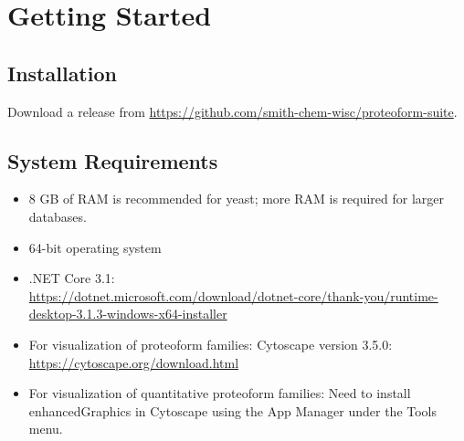 
\section{Getting Started}

\subsection{Installation}
Download a release from \url{https://github.com/smith-chem-wisc/proteoform-suite}.

\subsection{System Requirements}

\begin{itemize}

\item 8 GB of RAM is recommended for yeast; more RAM is required for larger databases.
\item 64-bit operating system
\item .NET Core 3.1: \\
\url{https://dotnet.microsoft.com/download/dotnet-core/thank-you/runtime-desktop-3.1.3-windows-x64-installer}
\item For visualization of proteoform families: Cytoscape\supercite{Shannon2003,Smoot2011} version 3.5.0: \\
 \url{https://cytoscape.org/download.html}
\item For visualization of quantitative proteoform families: Need to install enhancedGraphics in Cytoscape using the App Manager under the Tools menu.

\end{itemize}


